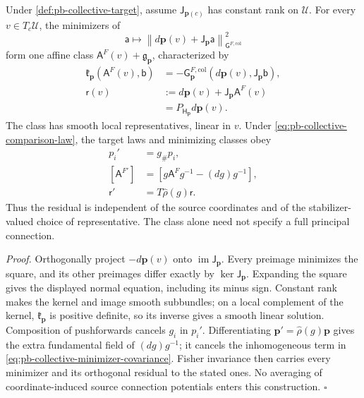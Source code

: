 Under \cref{def:pb-collective-target}, assume \(\mathsf J_{\boldsymbol p(c)}\) has constant rank
on \(\mathcal U\). For every \(v\in T_c\mathcal U\), the minimizers of
\begin{equation}
\mathsf a\longmapsto
\left\|d\boldsymbol p(v)+\mathsf J_{\boldsymbol p}\mathsf a\right\|^2_{\mathsf G^{F,\mathrm{col}}}
\label{eq:pb-collective-minimization}
\end{equation}
form one affine class \(\mathsf A^F(v)+\mathfrak g_{\boldsymbol p}\), characterized by
\begin{equation}
\begin{aligned}
\mathfrak k_{\boldsymbol p}(\mathsf A^F(v),\mathsf b)
&=-\mathsf G^{F,\mathrm{col}}_{\boldsymbol p}(d\boldsymbol p(v),\mathsf J_{\boldsymbol p}\mathsf b),\\
\mathsf r(v)&:=d\boldsymbol p(v)+\mathsf J_{\boldsymbol p}\mathsf A^F(v)\\
&=P_{\mathsf H_{\boldsymbol p}}d\boldsymbol p(v).
\end{aligned}
\label{eq:pb-collective-normal-equation}
\end{equation}
The class has smooth local representatives, linear in \(v\). Under
\cref{eq:pb-collective-comparison-law}, the target laws and minimizing classes obey
\begin{equation}
\begin{aligned}
p_i'&=g_\#p_i,\\
[\mathsf A^{F\prime}]&=[g\mathsf A^Fg^{-1}-(dg)g^{-1}],\\
\mathsf r'&=T\widehat\rho(g)\mathsf r.
\end{aligned}
\label{eq:pb-collective-minimizer-covariance}
\end{equation}
Thus the residual is independent of the source coordinates and of the stabilizer-valued choice
of representative. The class alone need not specify a full principal connection.

\noindent\emph{Proof.}
Orthogonally project \(-d\boldsymbol p(v)\) onto \(\operatorname{im}\mathsf J_{\boldsymbol p}\).
Every preimage minimizes the square, and its other preimages differ exactly by
\(\ker\mathsf J_{\boldsymbol p}\). Expanding the square gives the displayed normal equation,
including its minus sign. Constant rank makes the kernel and image smooth subbundles; on a local
complement of the kernel, \(\mathfrak k_{\boldsymbol p}\) is positive definite, so its inverse
gives a smooth linear solution. Composition of pushforwards cancels \(g_i\) in \(p_i'\).
Differentiating \(\boldsymbol p'=\widehat\rho(g)\boldsymbol p\) gives the extra fundamental
field of \((dg)g^{-1}\); it cancels the inhomogeneous term in
\cref{eq:pb-collective-minimizer-covariance}. Fisher invariance then carries every minimizer and
its orthogonal residual to the stated ones. No averaging of coordinate-induced source
connection potentials enters this construction. \hfill$\square$

